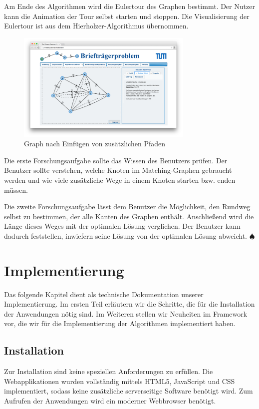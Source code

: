 Am Ende des Algorithmen wird die Eulertour des Graphen bestimmt. Der Nutzer kann die Animation der Tour selbst starten und stoppen. Die Visualisierung der Eulertour ist aus dem Hierholzer-Algorithmus übernommen.

\begin{figure}[h!]
	\centering
	\includegraphics[width=0.75\textwidth]{figures/postman_eulerian}
	\caption[Chinese-Postman: Eulerscher Graph]{Graph nach Einfügen von zusätzlichen Pfaden}\label{fig:postman_eulerian}
\end{figure}

Die erste Forschungsaufgabe sollte das Wissen des Benutzers prüfen. Der Benutzer sollte verstehen, welche Knoten im Matching-Graphen gebraucht werden und wie viele zusätzliche Wege in einem Knoten starten bzw. enden müssen.

Die zweite Forschungsaufgabe lässt dem Benutzer die Möglichkeit, den Rundweg selbst zu bestimmen, der alle Kanten des Graphen enthält. Anschließend wird die Länge dieses Weges mit der optimalen Lösung verglichen. Der Benutzer kann dadurch feststellen, inwiefern seine Lösung von der optimalen Lösung abweicht. \hfill$\spadesuit$

\chapter{Implementierung}
Das folgende Kapitel dient als technische Dokumentation unserer Implementierung. Im ersten Teil erläutern wir die Schritte, die für die Installation der Anwendungen nötig sind. Im Weiteren stellen wir Neuheiten im Framework vor, die wir für die Implementierung der Algorithmen implementiert haben.

\section{Installation} %
Zur Installation sind keine speziellen Anforderungen zu erfüllen. Die Webapplikationen wurden vollständig mittels HTML5, JavaScript und CSS implementiert, sodass keine zusätzliche serverseitige Software benötigt wird. Zum Aufrufen der Anwendungen wird ein moderner Webbrowser benötigt.

